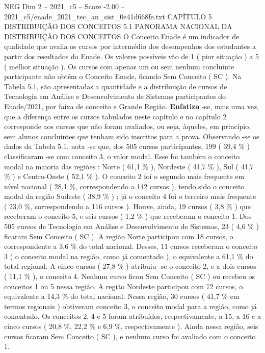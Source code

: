 \begin{textsample}{NEG Dim 2 – 2021\_c5 – Score -2.00 – 2021\_c5/enade\_2021\_tec\_an\_sist\_0e41d668fe.txt}  \label{ex:f2_neg_142}
CAPÍTULO 5 DISTRIBUIÇÃO DOS CONCEITOS 5.1 PANORAMA NACIONAL DA DISTRIBUIÇÃO DOS CONCEITOS O Conceito Enade é um indicador de qualidade que avalia os cursos por intermédio dos desempenhos dos estudantes a partir dos resultados do Enade.
Os valores possíveis vão de 1 ( pior situação ) a 5 ( melhor situação ).
Os cursos com apenas um ou sem nenhum concluinte participante não obtêm o Conceito Enade, ficando Sem Conceito ( SC ).
Na Tabela 5.1, são apresentadas a quantidade e a distribuição de cursos de Tecnologia em Análise e Desenvolvimento de Sistemas participantes do Enade/2021, por faixa de conceito e Grande Região. \textbf{Enfatiza} -se, mais uma vez, que a diferença entre os cursos tabulados neste capítulo e no capítulo 2 corresponde aos cursos que não foram avaliados, ou seja, àqueles, em princípio, sem alunos concluintes que tenham sido inscritos para a prova.
Observando -se os dados da Tabela 5.1, nota -se que, dos 505 cursos participantes, 199 ( 39,4 \% ) classificaram -se com conceito 3, o valor modal.
Esse foi também o conceito modal na maioria das regiões : Norte ( 61,1 \% ), Nordeste ( 41,7 \% ), Sul ( 41,7 \% ) e Centro-Oeste ( 52,1 \% ).
O conceito 2 foi o segundo mais frequente em nível nacional ( 28,1 \%, correspondendo a 142 cursos ), tendo sido o conceito modal da região Sudeste ( 38,9 \% ) ; já o conceito 4 foi o terceiro mais frequente ( 23,0 \%, correspondendo a 116 cursos ).
Houve, ainda, 19 cursos ( 3,8 \% ) que receberam o conceito 5, e seis cursos ( 1,2 \% ) que receberam o conceito 1.
Dos 505 cursos de Tecnologia em Análise e Desenvolvimento de Sistemas, 23 ( 4,6 \% ) ficaram Sem Conceito ( SC ).
A região Norte participou com 18 cursos, o correspondente a 3,6 \% do total nacional.
Desses, 11 cursos receberam o conceito 3 ( o conceito modal na região, como já comentado ), o equivalente a 61,1 \% do total regional.
A cinco cursos ( 27,8 \% ) atribuiu -se o conceito 2, e a dois cursos ( 11,1 \% ), o conceito 4.
Nenhum curso ficou Sem Conceito ( SC ) ou recebeu os conceitos 1 ou 5 nessa região.
A região Nordeste participou com 72 cursos, o equivalente a 14,3 \% do total nacional.
Nessa região, 30 cursos ( 41,7 \% em termos regionais ) obtiveram conceito 3, o conceito modal para a região, como já comentado.
Os conceitos 2, 4 e 5 foram atribuídos, respectivamente, a 15, a 16 e a cinco cursos ( 20,8 \%, 22,2 \% e 6,9 \%, respectivamente ).
Ainda nessa região, seis cursos ficaram Sem Conceito ( SC ), e nenhum curso foi avaliado com o conceito 1.

\end{textsample}
